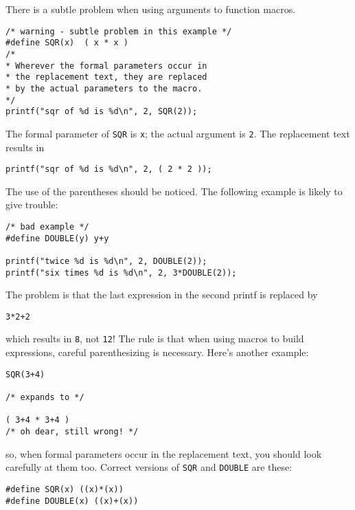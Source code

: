     There is a subtle problem when using arguments to function
     macros.


    \begin{Verbatim}
/* warning - subtle problem in this example */
#define SQR(x)  ( x * x )
/*
* Wherever the formal parameters occur in
* the replacement text, they are replaced
* by the actual parameters to the macro.
*/
printf("sqr of %d is %d\n", 2, SQR(2));
\end{Verbatim}

    The formal parameter of \texttt{SQR} is \texttt{x}; the
     actual argument is \texttt{2}. The replacement text results in


    \begin{Verbatim}
printf("sqr of %d is %d\n", 2, ( 2 * 2 ));
\end{Verbatim}

    The use of the parentheses should be noticed. The following example
     is likely to give trouble:


    \begin{Verbatim}
/* bad example */
#define DOUBLE(y) y+y

printf("twice %d is %d\n", 2, DOUBLE(2));
printf("six times %d is %d\n", 2, 3*DOUBLE(2));
\end{Verbatim}

    The problem is that the last expression in the second printf is
     replaced by


    \begin{Verbatim}
3*2+2
\end{Verbatim}

    which results in \texttt{8}, not \texttt{12}! The rule is
     that when using macros to build expressions, careful parenthesizing is
     necessary. Here's another example:


    \begin{Verbatim}
SQR(3+4)

/* expands to */

( 3+4 * 3+4 )
/* oh dear, still wrong! */
\end{Verbatim}

    so, when formal parameters occur in the replacement text, you should
     look carefully at them too. Correct versions of \texttt{SQR} and
     \texttt{DOUBLE} are these:


    \begin{Verbatim}
#define SQR(x) ((x)*(x))
#define DOUBLE(x) ((x)+(x))
\end{Verbatim}

